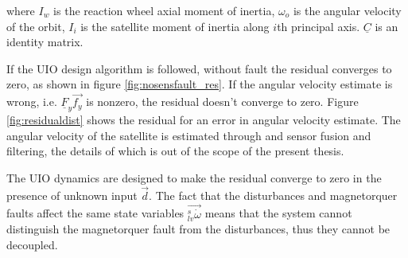 
where $I_w$ is the reaction wheel axial moment of inertia, $\omega_o$ is the angular velocity of the orbit, $I_i$ is the satellite moment of inertia along $i$th principal axis. $\underline{C}$ is an identity matrix. 

If the UIO design algorithm is followed, without fault the residual converges to zero, as shown in figure \ref{fig:nosensfault_res}. If the angular velocity estimate is wrong, i.e. $\underline{F}_y \vec{f_y}$ is nonzero, the residual doesn't converge to zero. Figure \ref{fig:residualdist} shows the residual for an error in angular velocity estimate. The angular velocity of the satellite is estimated through and sensor fusion and filtering, the details of which is out of the scope of the present thesis.

The UIO dynamics are designed to make the residual converge to zero in the presence of unknown input $\vec{d}$. The fact that the disturbances and magnetorquer faults affect the same state variables $\vec{_{lv}^s\dot{\omega}}$ means that the system cannot distinguish the magnetorquer fault from the disturbances, thus they cannot be decoupled.

